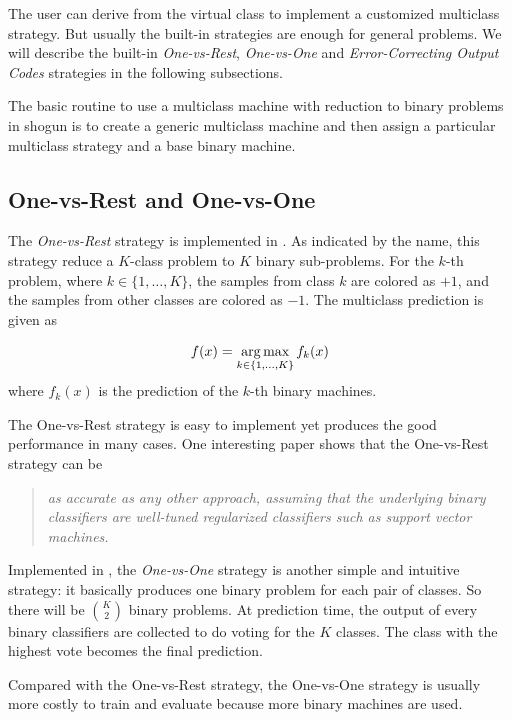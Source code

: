 The user can derive from the virtual class  to
implement a customized multiclass strategy. But usually the built-in strategies
are enough for general problems. We will describe the built-in \emph{One-vs-Rest},
\emph{One-vs-One} and \emph{Error-Correcting Output Codes} strategies in the
following subsections.

The basic routine to use a multiclass machine with reduction to binary problems
in shogun is to create a generic multiclass machine and then assign a particular
multiclass strategy and a base binary machine.

\subsection{One-vs-Rest and One-vs-One}

The \emph{One-vs-Rest} strategy is implemented in
. As indicated by the name, this
strategy reduce a $K$-class problem to $K$ binary sub-problems. For the $k$-th
problem, where $k\in\{1,\ldots,K\}$, the samples from class $k$ are colored as
$+1$, and the samples from other classes are colored as $-1$. The multiclass
prediction is given as

\[
	f(x) = \operatorname*{arg\,max}_{k\in\{1,\ldots,K\}} f_k(x)
\]
where $f_k(x)$ is the prediction of the $k$-th binary machines.

The One-vs-Rest strategy is easy to implement yet produces the good performance
in many cases. One interesting paper \citep{OneVsRestDefense} shows that the
One-vs-Rest strategy can be

\begin{quote}
	\emph{as accurate as any other approach, assuming that the underlying binary
classifiers are well-tuned regularized classifiers such as support vector
machines.}
\end{quote}

Implemented in , the 
\emph{One-vs-One} strategy \citep{OneVsOne} is another simple and intuitive 
strategy: it basically produces one binary problem for each pair of classes.  
So there will be $\binom{K}{2}$ binary problems. At prediction time, the 
output of every binary classifiers are collected to do voting for the $K$ 
classes. The class with the highest vote becomes the final prediction.

Compared with the One-vs-Rest strategy, the One-vs-One strategy is usually more
costly to train and evaluate because more binary machines are used.

